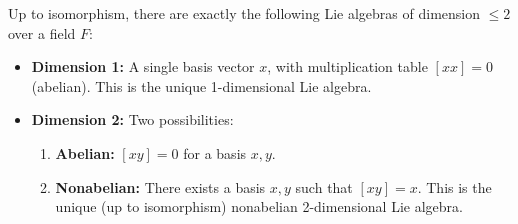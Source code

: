 Up to isomorphism, there are exactly the following Lie algebras of dimension $\leq 2$ over a field $F$:

\begin{itemize}
\item \textbf{Dimension 1:} A single basis vector $x$, with multiplication table $[xx] = 0$ (abelian). This is the unique 1-dimensional Lie algebra.
\item \textbf{Dimension 2:} Two possibilities:
  \begin{enumerate}
  \item \textbf{Abelian:} $[xy] = 0$ for a basis $x, y$.
  \item \textbf{Nonabelian:} There exists a basis $x, y$ such that $[xy] = x$. This is the unique (up to isomorphism) nonabelian 2-dimensional Lie algebra.
  \end{enumerate}
\end{itemize}
